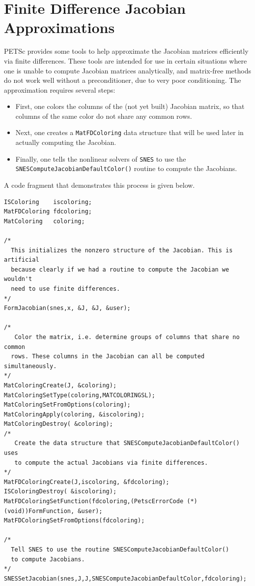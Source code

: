 \section{Finite Difference Jacobian Approximations}
\label{sec_fdmatrix}

PETSc provides some tools to help approximate the Jacobian matrices efficiently via
finite differences.  These tools are intended for use in certain situations where
one is unable to compute Jacobian matrices analytically, and matrix-free methods
do not work well without a preconditioner, due to very poor conditioning.
The approximation requires several steps:
\begin{itemize}
\item First, one colors the columns of the (not yet built) Jacobian matrix, so that
      columns of the same color do not share any common rows.
\item Next, one creates a \lstinline{MatFDColoring} data structure that will be used later in
      actually computing the Jacobian.
\item Finally, one tells the nonlinear solvers of \lstinline{SNES} to use the
      \lstinline{SNESComputeJacobianDefaultColor()}
      routine to compute the Jacobians.
\end{itemize}
A code fragment that demonstrates this process is given below.
\begin{lstlisting}
ISColoring    iscoloring;
MatFDColoring fdcoloring;
MatColoring   coloring;

/*
  This initializes the nonzero structure of the Jacobian. This is artificial
  because clearly if we had a routine to compute the Jacobian we wouldn't
  need to use finite differences.
*/
FormJacobian(snes,x, &J, &J, &user);

/*
   Color the matrix, i.e. determine groups of columns that share no common 
  rows. These columns in the Jacobian can all be computed simultaneously.
*/
MatColoringCreate(J, &coloring);
MatColoringSetType(coloring,MATCOLORINGSL);
MatColoringSetFromOptions(coloring);
MatColoringApply(coloring, &iscoloring);
MatColoringDestroy( &coloring);
/*
   Create the data structure that SNESComputeJacobianDefaultColor() uses
   to compute the actual Jacobians via finite differences.
*/
MatFDColoringCreate(J,iscoloring, &fdcoloring);
ISColoringDestroy( &iscoloring);
MatFDColoringSetFunction(fdcoloring,(PetscErrorCode (*)(void))FormFunction, &user);
MatFDColoringSetFromOptions(fdcoloring);

/*
  Tell SNES to use the routine SNESComputeJacobianDefaultColor()
  to compute Jacobians.
*/
SNESSetJacobian(snes,J,J,SNESComputeJacobianDefaultColor,fdcoloring);

\end{lstlisting}

